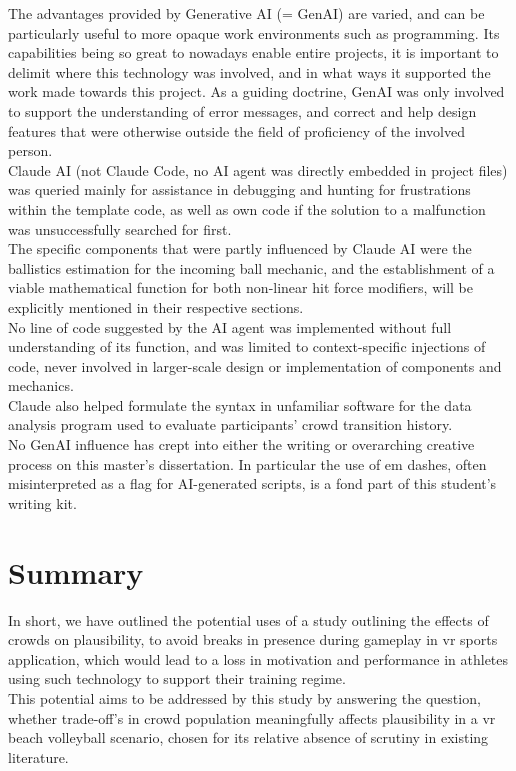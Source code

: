 The advantages provided by Generative AI (= GenAI) are varied, and can be particularly useful to more opaque work environments such as programming. Its capabilities being so great to nowadays enable entire projects, it is important to delimit where this technology was involved, and in what ways it supported the work made towards this project. As a guiding doctrine, GenAI was only involved to support the understanding of error messages, and correct and help design features that were otherwise outside the field of proficiency of the involved person.\\
Claude AI (not Claude Code, no AI agent was directly embedded in project files) was queried mainly for assistance in debugging and hunting for frustrations within the template code, as well as own code if the solution to a malfunction was unsuccessfully searched for first.\\

The specific components that were partly influenced by Claude AI were the ballistics estimation for the incoming ball mechanic, and the establishment of a viable mathematical function for both non-linear hit force modifiers, will be explicitly mentioned in their respective sections.\\
No line of code suggested by the AI agent was implemented without full understanding of its function, and was limited to context-specific injections of code, never involved in larger-scale design or implementation of components and mechanics.\\

Claude also helped formulate the syntax in unfamiliar software for the data analysis program used to evaluate participants' crowd transition history.\\

No GenAI influence has crept into either the writing or overarching creative process on this master's dissertation. In particular the use of em dashes, often misinterpreted as a flag for AI-generated scripts, is a fond part of this student's writing kit. 

\section{Summary}
\label{sec:SummaryDesign}

In short, we have outlined the potential uses of a study outlining the effects of crowds on plausibility, to avoid breaks in presence during gameplay in \gls{vr} sports application, which would lead to a loss in motivation and performance in athletes using such technology to support their training regime.\\
This potential aims to be addressed by this study by answering the question, whether trade-off's in crowd population meaningfully affects plausibility in a \gls{vr} beach volleyball scenario, chosen for its relative absence of scrutiny in existing literature.\\

